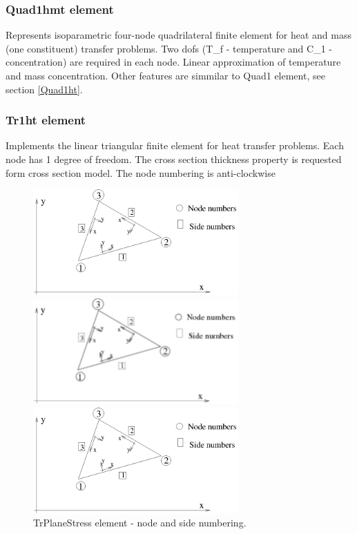 \documentclass[a4paper]{article}
\begin{document}
\subsubsection{Quad1hmt element}
Represents isoparametric four-node quadrilateral finite element for
heat and mass (one constituent) transfer problems. 
Two dofs (T\_f - temperature and C\_1 - concentration) are required in
each node. Linear approximation of temperature and mass concentration.
Other features are simmilar to Quad1 element, see section \ref{Quad1ht}.

\subsubsection{Tr1ht element}
\label{Tr1ht}
Implements the linear triangular finite element for heat transfer problems. Each node has 1 degree of freedom.
The cross section thickness property is requested form cross section model.
The node numbering is anti-clockwise

\begin{figure}[htb]
\begin{htmlonly}
  \centerline{\includegraphics[width=0.7\textwidth]{trplanstrss.eps}}
\end{htmlonly}
\ifpdf
 \centerline{\includegraphics[width=0.7\textwidth]{trplanstrss.pdf}}
\else
 \centerline{\includegraphics[width=0.7\textwidth]{trplanstrss.eps}}
\fi
\caption{TrPlaneStress element - node and side numbering.}
\label{Tr1htfig}
\end{figure}
\end{document}
